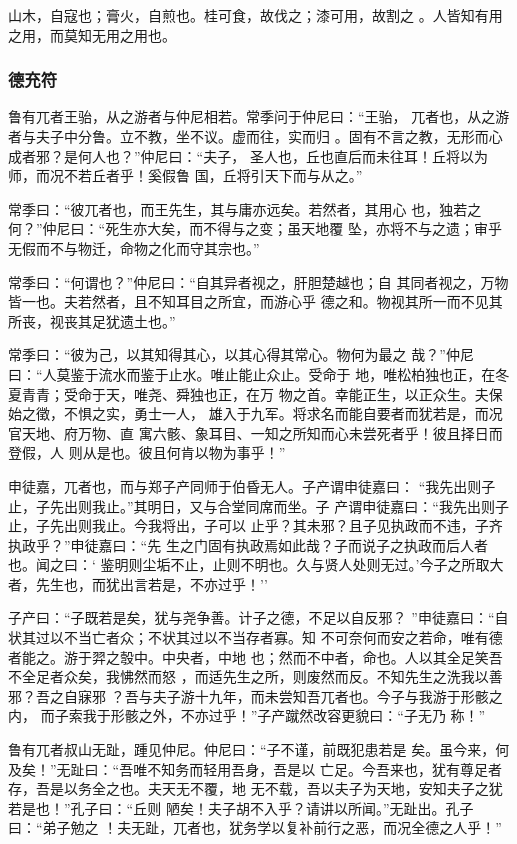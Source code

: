 \documentclass[]{article}
\begin{document}
山木，自寇也；膏火，自煎也。桂可食，故伐之；漆可用，故割之
。人皆知有用之用，而莫知无用之用也。

\hypertarget{header-n621}{%
\subsubsection{德充符}\label{header-n621}}

鲁有兀者王骀，从之游者与仲尼相若。常季问于仲尼曰：``王骀，
兀者也，从之游者与夫子中分鲁。立不教，坐不议。虚而往，实而归
。固有不言之教，无形而心成者邪？是何人也？''仲尼曰：``夫子，
圣人也，丘也直后而未往耳！丘将以为师，而况不若丘者乎！奚假鲁
国，丘将引天下而与从之。''

常季曰：``彼兀者也，而王先生，其与庸亦远矣。若然者，其用心
也，独若之何？''仲尼曰：``死生亦大矣，而不得与之变；虽天地覆
坠，亦将不与之遗；审乎无假而不与物迁，命物之化而守其宗也。''

常季曰：``何谓也？''仲尼曰：``自其异者视之，肝胆楚越也；自
其同者视之，万物皆一也。夫若然者，且不知耳目之所宜，而游心乎
德之和。物视其所一而不见其所丧，视丧其足犹遗土也。''

常季曰：``彼为己，以其知得其心，以其心得其常心。物何为最之
哉？''仲尼曰：``人莫鉴于流水而鉴于止水。唯止能止众止。受命于
地，唯松柏独也正，在冬夏青青；受命于天，唯尧、舜独也正，在万
物之首。幸能正生，以正众生。夫保始之徵，不惧之实，勇士一人，
雄入于九军。将求名而能自要者而犹若是，而况官天地、府万物、直
寓六骸、象耳目、一知之所知而心未尝死者乎！彼且择日而登假，人
则从是也。彼且何肯以物为事乎！''

申徒嘉，兀者也，而与郑子产同师于伯昏无人。子产谓申徒嘉曰：
``我先出则子止，子先出则我止。''其明日，又与合堂同席而坐。子
产谓申徒嘉曰：``我先出则子止，子先出则我止。今我将出，子可以
止乎？其未邪？且子见执政而不违，子齐执政乎？''申徒嘉曰：``先
生之门固有执政焉如此哉？子而说子之执政而后人者也。闻之曰：`
鉴明则尘垢不止，止则不明也。久与贤人处则无过。'今子之所取大
者，先生也，而犹出言若是，不亦过乎！''

子产曰：``子既若是矣，犹与尧争善。计子之德，不足以自反邪？
''申徒嘉曰：``自状其过以不当亡者众；不状其过以不当存者寡。知
不可奈何而安之若命，唯有德者能之。游于羿之彀中。中央者，中地
也；然而不中者，命也。人以其全足笑吾不全足者众矣，我怫然而怒
，而适先生之所，则废然而反。不知先生之洗我以善邪？吾之自寐邪
？吾与夫子游十九年，而未尝知吾兀者也。今子与我游于形骸之内，
而子索我于形骸之外，不亦过乎！''子产蹴然改容更貌曰：``子无乃 称！''

鲁有兀者叔山无趾，踵见仲尼。仲尼曰：``子不谨，前既犯患若是
矣。虽今来，何及矣！''无趾曰：``吾唯不知务而轻用吾身，吾是以
亡足。今吾来也，犹有尊足者存，吾是以务全之也。夫天无不覆，地
无不载，吾以夫子为天地，安知夫子之犹若是也！''孔子曰：``丘则
陋矣！夫子胡不入乎？请讲以所闻。''无趾出。孔子曰：``弟子勉之
！夫无趾，兀者也，犹务学以复补前行之恶，而况全德之人乎！''
\end{document}
